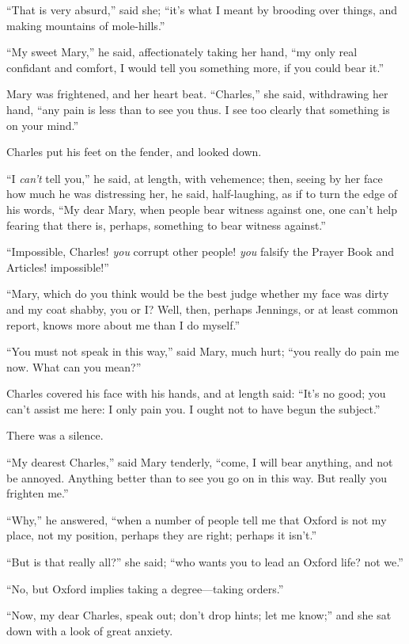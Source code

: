 ``That is very absurd,'' said she; ``it's what I meant
by brooding over things, and making mountains of mole-hills.''

``My sweet Mary,'' he said, affectionately taking her hand,
``my only real confidant and comfort, I would tell you something
more, if you could bear it.''

Mary was frightened, and her heart beat. ``Charles,'' she
said, withdrawing her hand, ``any pain is less than to see you
thus. I see too clearly that something is on your mind.''

Charles put his feet on the fender, and looked down.

``I \emph{can't}
tell you,'' he said, at length, with vehemence; then, seeing by
her face how much he was distressing her, he said, half-laughing, as
if to turn the edge of his words, ``My dear Mary, when people bear
witness against one, one can't help fearing that there is, perhaps,
something to bear witness against.''

``Impossible, Charles! \emph{you} corrupt other people! \emph{you}
falsify the Prayer Book and Articles! impossible!''

``Mary, which do you think would be the best judge whether my face was dirty and my coat shabby, you or I? Well, then,
perhaps Jennings, or at least common report, knows more about me than
I do myself.''

``You must not speak in this way,'' said Mary, much hurt;
``you really do pain me now. What can you mean?''

Charles covered his face with his hands, and at length said:
``It's no good; you can't assist me here: I only pain you. I ought
not to have begun the subject.''

There was a silence.

``My dearest Charles,'' said Mary tenderly, ``come, I
will bear anything, and not be annoyed. Anything better than to see
you go on in this way. But really you frighten me.''

``Why,'' he answered, ``when a number of people tell me
that Oxford is not my place, not my position, perhaps they are right;
perhaps it isn't.''

``But is that really all?'' she said; ``who wants you
to lead an Oxford life? not we.''

``No, but Oxford implies taking a degree—taking orders.''

``Now, my dear Charles, speak out; don't drop hints; let me
know;'' and she sat down with a look of great anxiety.

